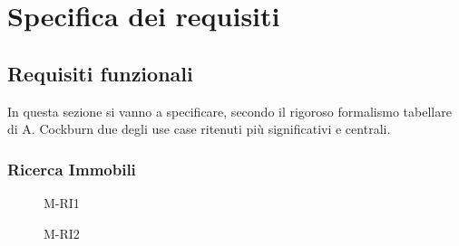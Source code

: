 \chapter{Specifica dei requisiti}
\section{Requisiti funzionali}
In questa sezione si vanno a specificare, secondo il rigoroso 
formalismo tabellare di A. Cockburn due degli use case ritenuti 
più significativi e centrali.
\subsection{Ricerca Immobili}

\begin{figure}[h]
    \centering
    \caption{M-RI1}
    \label{fig:M-RI1}
\end{figure}

\begin{figure}[h]
    \centering
    \caption{M-RI2}
    \label{fig:M-RI2}
\end{figure}


